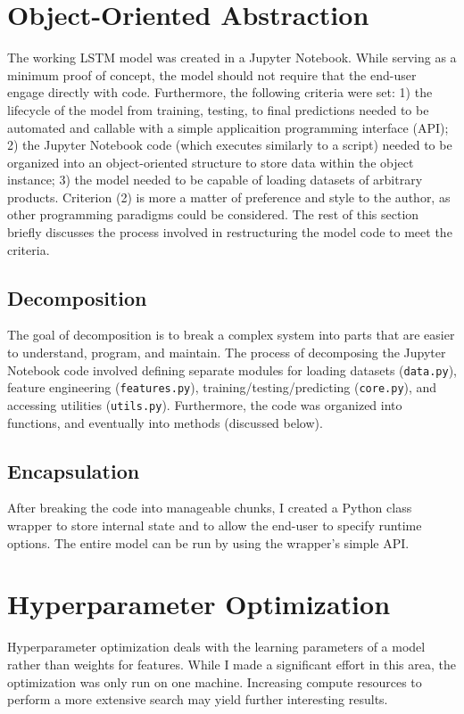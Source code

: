 \documentclass[11pt, oneside]{article}
\begin{document}
\section{Object-Oriented Abstraction}
The working LSTM model was created in a Jupyter Notebook. While serving as a minimum proof of concept, the model should not require that the end-user engage directly with code. Furthermore, the following criteria were set: 1) the lifecycle of the model from training, testing, to final predictions needed to be automated and callable with a simple applicaition programming interface (API); 2) the Jupyter Notebook code (which executes similarly to a script) needed to be organized into an object-oriented structure to store data within the object instance; 3) the model needed to be capable of loading datasets of arbitrary products. Criterion (2) is more a matter of preference and style to the author, as other programming paradigms could be considered. The rest of this section briefly discusses the process involved in restructuring the model code to meet the criteria.

\subsection{Decomposition}
The goal of decomposition is to break a complex system into parts that are easier to understand, program, and maintain. The process of decomposing the Jupyter Notebook code involved defining separate modules for loading datasets (\texttt{data.py}), feature engineering (\texttt{features.py}), training/testing/predicting (\texttt{core.py}), and accessing utilities (\texttt{utils.py}). Furthermore, the code was organized into functions, and eventually into methods (discussed below).

\subsection{Encapsulation}
After breaking the code into manageable chunks, I created a Python class wrapper to store internal state and to allow the end-user to specify runtime options. The entire model can be run by using the wrapper's simple API.

\section{Hyperparameter Optimization}
Hyperparameter optimization deals with the learning parameters of a model rather than weights for features. While I made a significant effort in this area, the optimization was only run on one machine. Increasing compute resources to perform a more extensive search may yield further interesting results.
\end{document}
